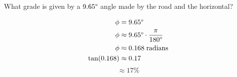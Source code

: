 \begin{problem}[23]
    What grade is given by a $9.65\degree$ angle made by the road and the horizontal?
\end{problem}

\begin{solution}
    \begin{align}
        \phi &= 9.65\degree \\
        \phi &\approx 9.65\degree \cdot \frac{\pi}{180\degree} \\
        \phi &\approx 0.168 \; \text{radians} \\
        \tan(0.168) &\approx 0.17
    \end{align}
    \[\boxed{\approx 17\%}\]
\end{solution}